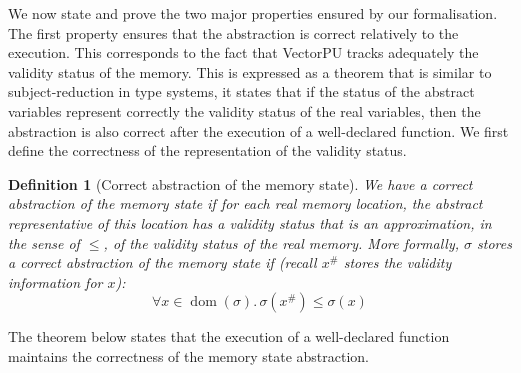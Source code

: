 \documentclass[preprint,12pt]{elsarticle}
\newtheorem{definition}{Definition}
\newcommand{\abs}[1]{#1^\#}
\DeclareMathOperator{\dom}{dom}
\begin{document}
\smallskip

We now state and  prove the two major properties ensured by our formalisation.
The first property ensures that the abstraction is correct relatively to the 
execution. This corresponds to the fact that VectorPU tracks adequately the validity 
status of the 
memory. This is expressed as a theorem that is similar to subject-reduction in type 
systems, it states that if the status of the abstract variables represent correctly the 
validity status of the real variables, then the 
abstraction is also correct after the execution of a  well-declared function.  We first define the correctness of the representation of the validity status.
\begin{definition}[Correct abstraction of the memory state]\label{CorrectAbstraction}
We have a \emph{correct abstraction of the memory state} if for each real memory 
location, the abstract representative of this location has a validity status that is an 
approximation, in the sense of $\leq$, of the validity status of the real memory. More formally, $\sigma$ stores a correct abstraction of the memory state if (recall $\abs x$ stores the validity information for $x$):
\[ \forall x\in \dom(\sigma).\, \sigma(\abs x)\leq\sigma(x) \]
\end{definition}
 The 
theorem below states that the execution of a well-declared function maintains the 
correctness of the memory state 
abstraction. 
\end{document}
